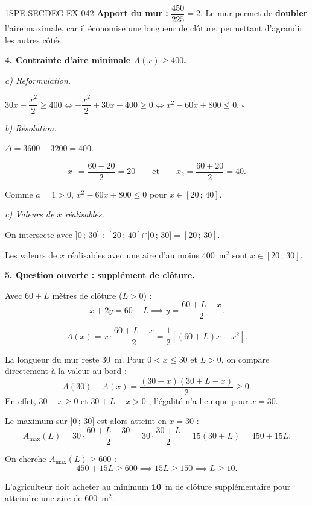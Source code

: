 \begin{corrige}{1SPE-SECDEG-EX-042}
\textbf{Apport du mur :} $\dfrac{450}{225} = 2$. Le mur permet de \textbf{doubler} l'aire maximale, car il économise une longueur de clôture, permettant d'agrandir les autres côtés.

\medskip
\textbf{4. Contrainte d'aire minimale $A(x) \geqslant 400$.}

\textit{a) Reformulation.}


$30x - \dfrac{x^2}{2} \geqslant 400 \iff -\dfrac{x^2}{2} + 30x - 400 \geqslant 0 \iff x^2 - 60x + 800 \leqslant 0$. \hfill $\square$

\textit{b) Résolution.}

$\Delta = 3600 - 3200 = 400$.

\[x_1 = \frac{60 - 20}{2} = 20 \qquad \text{et} \qquad x_2 = \frac{60 + 20}{2} = 40.\]

Comme $a = 1 > 0$, $x^2 - 60x + 800 \leqslant 0$ pour $x \in [20\,;\,40]$.

\textit{c) Valeurs de $x$ réalisables.}

On intersecte avec $]0\,;\,30]$ : $[20\,;\,40] \cap ]0\,;\,30] = [20\,;\,30]$.

Les valeurs de $x$ réalisables avec une aire d'au moins $400$~m$^2$ sont $x \in [20\,;\,30]$.

\medskip
\textbf{5. Question ouverte : supplément de clôture.}


Avec $60 + L$ mètres de clôture ($L > 0$) :
\[x + 2y = 60 + L \implies y = \frac{60 + L - x}{2}.\]

\[A(x) = x \cdot \frac{60 + L - x}{2} = \frac{1}{2}\left[(60+L)x - x^2\right].\]

La longueur du mur reste $30$~m. Pour $0<x\leq30$ et $L>0$, on compare
directement à la valeur au bord :
\[A(30)-A(x)=\frac{(30-x)(30+L-x)}{2}\geq0.\]
En effet, $30-x\geq0$ et $30+L-x>0$ ; l'égalité n'a lieu que pour $x=30$.

Le maximum sur $]0\,;\,30]$ est alors atteint en $x = 30$ :
\[A_{\max}(L) = 30 \cdot \frac{60 + L - 30}{2} = 30 \cdot \frac{30 + L}{2} = 15(30 + L) = 450 + 15L.\]

On cherche $A_{\max}(L) \geqslant 600$ :
\[450 + 15L \geqslant 600 \implies 15L \geqslant 150 \implies L \geqslant 10.\]

L'agriculteur doit acheter au minimum $\mathbf{10}$~m de clôture supplémentaire pour atteindre une aire de $600$~m$^2$.

\end{corrige}
